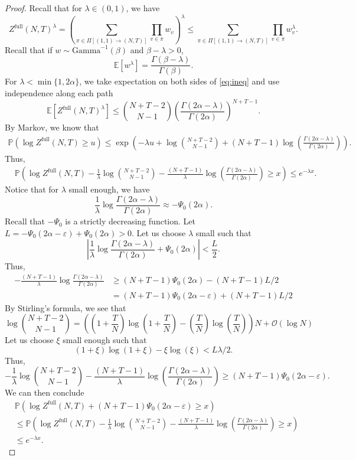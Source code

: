 \documentclass[10pt,a4paper]{amsart}
\newcommand{\E}{\mathbb{E}}
\newcommand{\Prob}{\mathbb{P}}
\newcommand{\Zfull}{Z^{\mathrm{full}}}
\begin{document}
\begin{proof}
Recall that for $\lambda \in (0,1)$, we have
\begin{equation}\label{eq:ineq}
\Zfull(N,T)^\lambda =\left( \sum_{\pi \in \Pi[(1,1) \rightarrow (N,T)]} \prod_{v \in \pi} w_v\right)^\lambda \leq \sum_{\pi \in \Pi[(1,1) \rightarrow (N,T)]} \prod_{v \in \pi} w_v^\lambda.
\end{equation}
Recall that if $w \sim \mathrm{Gamma}^{-1}(\beta)$ and $\beta-\lambda > 0$,
\[
\E[w^\lambda] = \frac{\Gamma(\beta - \lambda)}{\Gamma(\beta)}.
\] 
For $\lambda < \min\{1, 2\alpha\}$, we take expectation on both sides of \eqref{eq:ineq} and use independence along each path
\[
\E[\Zfull(N,T)^\lambda] \leq \binom{N+T-2}{N-1}\left( \frac{\Gamma(2\alpha -\lambda)}{\Gamma(2\alpha)}\right)^{N+T-1}.
\]
By Markov, we know that
\[
\begin{split}
    \Prob\left( \log \Zfull(N,T) \geq u \right)\leq \exp\left(-\lambda u + \log \binom{N+T-2}{N-1}+ (N+T-1)\log \left(\frac{\Gamma(2\alpha - \lambda)}{\Gamma(2\alpha)} \right) \right).
\end{split}
\]
Thus,
\[
\begin{split}
    &\Prob\left( \log \Zfull(N,T) - \frac{1}{\lambda} \log \binom{N+T-2}{N-1}-\frac{(N+T-1)}{\lambda} \log \left(\frac{\Gamma(2\alpha - \lambda)}{\Gamma(2\alpha)} \right) \geq x \right) \leq e^{-\lambda x}.
\end{split}
\]
Notice that for $\lambda$ small enough, we have
\[
\frac{1}{\lambda}\log\frac{\Gamma(2\alpha - \lambda)}{\Gamma(2\alpha)} \approx -\Psi_0(2\alpha).
\]
Recall that $-\Psi_0$ is a strictly decreasing function. Let $L = -\Psi_0(2\alpha-\varepsilon) + \Psi_0(2\alpha) > 0$. Let us choose $\lambda$ small such that 
\[
\left|\frac{1}{\lambda}\log\frac{\Gamma(2\alpha - \lambda)}{\Gamma(2\alpha)} + \Psi_0(2\alpha)\right| < \frac{L}{2}.
\]
Thus,
\[
\begin{aligned}
 -\frac{(N+T-1)}{\lambda}\log\frac{\Gamma(2\alpha - \lambda)}{\Gamma(2\alpha)} &\geq (N+T-1)\Psi_0(2\alpha) - (N+T-1)L/2\\
&= (N+T-1)\Psi_0(2\alpha-\varepsilon) + (N+T-1)L/2
\end{aligned}
\]
By Stirling's formula, we see that
\[
\log \binom{N+T-2}{N-1} =\left( \left(1+\frac{T}{N}\right)\log \left(1+\frac{T}{N}\right) -  \left(\frac{T}{N}\right)\log\left(\frac{T}{N}\right) \right) N + \mathcal{O}(\log N)
\]
Let us choose $\xi$ small enough such that 
\[
(1+\xi)\log(1+\xi)-\xi\log(\xi) < L\lambda/2.
\]
Thus, 
\[
- \frac{1}{\lambda} \log \binom{N+T-2}{N-1}-\frac{(N+T-1)}{\lambda} \log \left(\frac{\Gamma(2\alpha - \lambda)}{\Gamma(2\alpha)} \right) \geq (N+T-1)\Psi_0(2\alpha-\varepsilon).
\] 
We can then conclude
\[
\begin{split}
&\Prob\left( \log \Zfull(N,T) +(N+T-1)\Psi_0(2\alpha-\varepsilon) \geq x \right)\\
    &\leq \Prob\left( \log \Zfull(N,T) - \frac{1}{\lambda} \log \binom{N+T-2}{N-1} -\frac{(N+T-1)}{\lambda} \log \left(\frac{\Gamma(2\alpha - \lambda)}{\Gamma(2\alpha)} \right) \geq x \right)\\
    &\leq e^{-\lambda x}.
\end{split}
\]
\end{proof}
\end{document}
